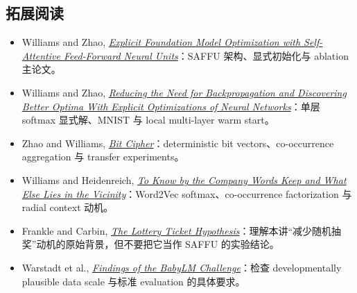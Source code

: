 \subsection{拓展阅读}

\begingroup
\small
\setlength{\itemsep}{2pt}
\begin{itemize}
  \item Williams and Zhao, \href{https://arxiv.org/abs/2311.07510}{\emph{Explicit Foundation Model Optimization with Self-Attentive Feed-Forward Neural Units}}：SAFFU 架构、显式初始化与 ablation 主论文。
  \item Williams and Zhao, \href{https://arxiv.org/abs/2311.07498}{\emph{Reducing the Need for Backpropagation and Discovering Better Optima With Explicit Optimizations of Neural Networks}}：单层 softmax 显式解、MNIST 与 local multi-layer warm start。
  \item Zhao and Williams, \href{https://arxiv.org/abs/2311.11012}{\emph{Bit Cipher}}：deterministic bit vectors、co-occurrence aggregation 与 transfer experiments。
  \item Williams and Heidenreich, \href{https://arxiv.org/abs/2205.00148}{\emph{To Know by the Company Words Keep and What Else Lies in the Vicinity}}：Word2Vec softmax、co-occurrence factorization 与 radial context 动机。
  \item Frankle and Carbin, \href{https://arxiv.org/abs/1803.03635}{\emph{The Lottery Ticket Hypothesis}}：理解本讲“减少随机抽奖”动机的原始背景，但不要把它当作 SAFFU 的实验结论。
  \item Warstadt et al., \href{https://arxiv.org/abs/2310.00915}{\emph{Findings of the BabyLM Challenge}}：检查 developmentally plausible data scale 与标准 evaluation 的具体要求。
\end{itemize}
\endgroup


